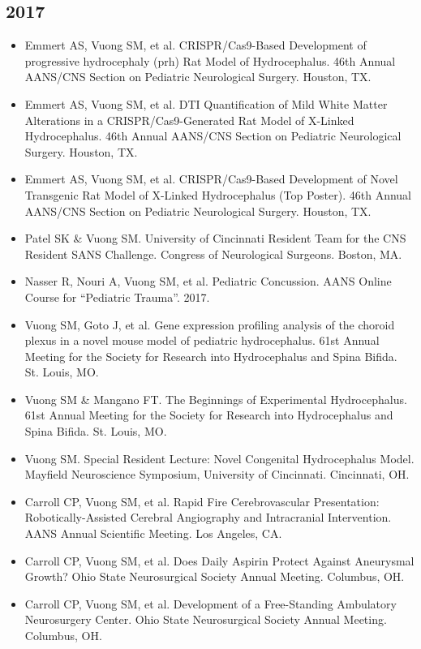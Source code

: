 \documentclass[11pt, a4paper]{article}
\begin{document}
\subsection{2017}
\begin{itemize}
  \setlength\itemindent{0.25em}
  \item Emmert AS, Vuong SM, et al. CRISPR/Cas9-Based Development of progressive hydrocephaly (prh) Rat Model of Hydrocephalus. 46th Annual AANS/CNS Section on Pediatric Neurological Surgery. Houston, TX.
  \item Emmert AS, Vuong SM, et al. DTI Quantification of Mild White Matter Alterations in a CRISPR/Cas9-Generated Rat Model of X-Linked Hydrocephalus. 46th Annual AANS/CNS Section on Pediatric Neurological Surgery. Houston, TX.
  \item Emmert AS, Vuong SM, et al. CRISPR/Cas9-Based Development of Novel Transgenic Rat Model of X-Linked Hydrocephalus (Top Poster). 46th Annual AANS/CNS Section on Pediatric Neurological Surgery. Houston, TX.
  \item Patel SK \& Vuong SM. University of Cincinnati Resident Team for the CNS Resident SANS Challenge. Congress of Neurological Surgeons. Boston, MA.
  \item Nasser R, Nouri A, Vuong SM, et al. Pediatric Concussion. AANS Online Course for ``Pediatric Trauma''. 2017.
  \item Vuong SM, Goto J, et al. Gene expression profiling analysis of the choroid plexus in a novel mouse model of pediatric hydrocephalus. 61st Annual Meeting for the Society for Research into Hydrocephalus and Spina Bifida. St. Louis, MO.
  \item Vuong SM \& Mangano FT. The Beginnings of Experimental Hydrocephalus. 61st Annual Meeting for the Society for Research into Hydrocephalus and Spina Bifida. St. Louis, MO.
  \item Vuong SM. Special Resident Lecture: Novel Congenital Hydrocephalus Model. Mayfield Neuroscience Symposium, University of Cincinnati. Cincinnati, OH.
  \item Carroll CP, Vuong SM, et al. Rapid Fire Cerebrovascular Presentation: Robotically-Assisted Cerebral Angiography and Intracranial Intervention. AANS Annual Scientific Meeting. Los Angeles, CA.
  \item Carroll CP, Vuong SM, et al. Does Daily Aspirin Protect Against Aneurysmal Growth? Ohio State Neurosurgical Society Annual Meeting. Columbus, OH.
  \item Carroll CP, Vuong SM, et al. Development of a Free-Standing Ambulatory Neurosurgery Center. Ohio State Neurosurgical Society Annual Meeting. Columbus, OH.

\end{itemize}
\end{document}
